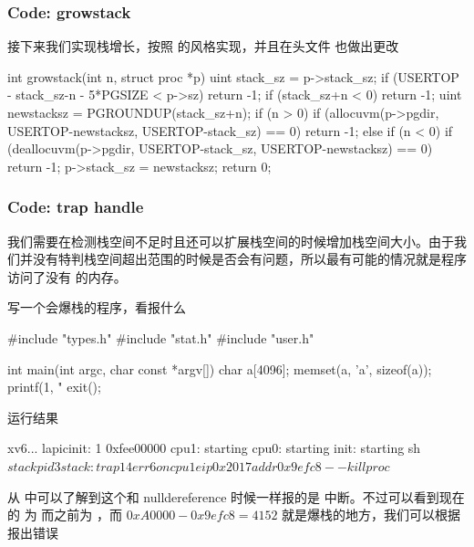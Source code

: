 \subsubsection{Code: growstack}

接下来我们实现栈增长，按照  的风格实现，并且在头文件  也做出更改



\begin{ccode}
    int growstack(int n, struct proc *p) {
        uint stack_sz = p->stack_sz;
        if (USERTOP - stack_sz-n - 5*PGSIZE < p->sz)
            return -1;
        if (stack_sz+n < 0)
            return -1;
        uint newstacksz = PGROUNDUP(stack_sz+n);
        if (n > 0) {
            if (allocuvm(p->pgdir, USERTOP-newstacksz, USERTOP-stack_sz) == 0)
            return -1;
        } else if (n < 0) {
            if (deallocuvm(p->pgdir, USERTOP-stack_sz, USERTOP-newstacksz) == 0)
            return -1;
        }
        p->stack_sz = newstacksz;
        return 0;
    }
\end{ccode}

\subsubsection{Code: trap handle}
 
我们需要在检测栈空间不足时且还可以扩展栈空间的时候增加栈空间大小。由于我们并没有特判栈空间超出范围的时候是否会有问题，所以最有可能的情况就是程序访问了没有  的内存。

写一个会爆栈的程序，看报什么 


\begin{ccode}
    #include "types.h"
    #include "stat.h"
    #include "user.h"

    int main(int argc, char const *argv[])
    {
        char a[4096];
        memset(a, 'a', sizeof(a));
        printf(1, "%
        exit();
    }
\end{ccode}

运行结果

\begin{textcode}
    xv6...
    lapicinit: 1 0xfee00000
    cpu1: starting
    cpu0: starting
    init: starting sh
    $ stack
    pid 3 stack: trap 14 err 6 on cpu 1 eip 0x2017 addr 0x9efc8--kill proc
    $ 
\end{textcode}

从  中可以了解到这个和 nulldereference 时候一样报的是  中断。不过可以看到现在的  为  而之前为 ，而 $0xA0000-0x9efc8 = 4152$ 就是爆栈的地方，我们可以根据  报出错误

